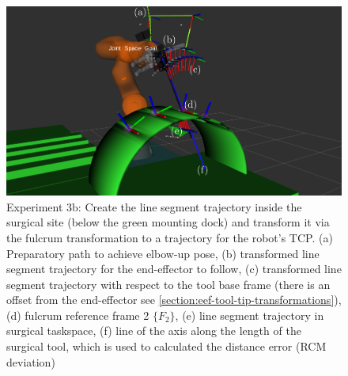 \begin{center}
\begin{figure}[!htb]
\centering
\includegraphics[width=\textwidth]{images/robot_planner3/3b_line_seg.png}
\caption{Experiment 3b: Create the line segment trajectory inside the surgical site (below the green mounting dock) and transform it via the fulcrum transformation to a trajectory for the robot's TCP.
(a) Preparatory path to achieve elbow-up pose, (b) transformed line segment trajectory for the end-effector to follow, (c) transformed line segment trajectory with respect to the tool base frame (there is an offset from the 
end-effector see \ref{section:eef-tool-tip-transformations}), (d) fulcrum reference frame 2 $\lbrace F_2 \rbrace$, (e) line segment trajectory in surgical taskspace, (f) line of the axis along the length of the surgical tool, 
which is used to calculated the distance error (RCM deviation)}
\label{robot-planner3b-line-seg}
\end{figure}
\end{center}

